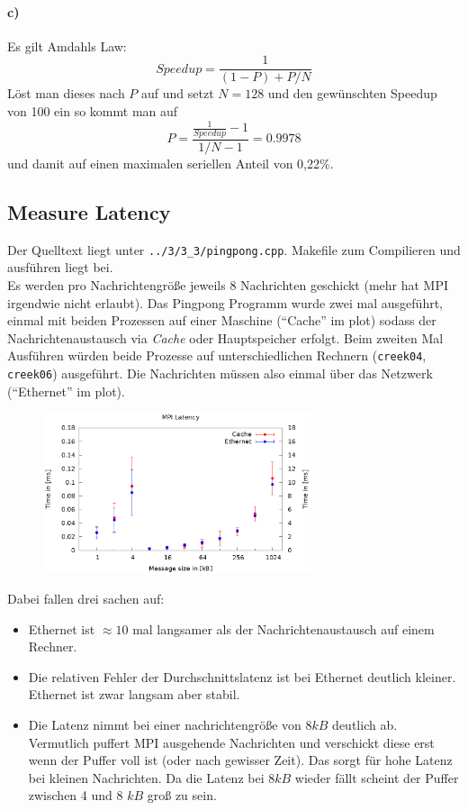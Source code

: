 \documentclass[a4paper,11pt]{scrartcl}
\begin{document}
\paragraph*{c)}
Es gilt Amdahls Law:
\[
Speedup=\frac{1}{(1-P)+P/N}
\] 
Löst man dieses nach $P$ auf und setzt $N=128$ und den gewünschten Speedup von 100 ein so kommt man auf
\[
P=\frac{\frac{1}{Speedup}-1}{1/N-1}=0.9978
\]
und damit auf einen maximalen seriellen Anteil von 0,22\%.
\subsection{Measure Latency}

Der Quelltext liegt unter \verb+../3/3_3/pingpong.cpp+. Makefile zum Compilieren und ausführen liegt bei. \\

Es werden pro Nachrichtengröße jeweils 8 Nachrichten geschickt (mehr hat MPI irgendwie nicht erlaubt). Das Pingpong Programm wurde zwei mal ausgeführt, einmal mit beiden Prozessen auf einer Maschine ("`Cache"' im plot) sodass der Nachrichtenaustausch via \emph{Cache} oder Hauptspeicher erfolgt. Beim zweiten Mal Ausführen würden beide Prozesse auf unterschiedlichen Rechnern (\verb+creek04+, \verb+creek06+) ausgeführt. Die Nachrichten müssen also einmal über das Netzwerk ("`Ethernet"' im plot).\\

\begin{figure}[!ht]
\centering
\includegraphics[width=0.7\textwidth,keepaspectratio]{3_3/data/plot.eps}
\end{figure}

Dabei fallen drei sachen auf: 

\begin{itemize}
    \item Ethernet ist $\approx 10$ mal langsamer als der Nachrichtenaustausch auf einem Rechner.
    \item Die relativen Fehler der Durchschnittslatenz ist bei Ethernet deutlich kleiner. Ethernet ist zwar langsam aber stabil.
    \item Die Latenz nimmt bei einer nachrichtengröße von $8kB$ deutlich ab. Vermutlich puffert MPI ausgehende Nachrichten und verschickt diese erst wenn der Puffer voll ist (oder nach gewisser Zeit). Das sorgt für hohe Latenz bei kleinen Nachrichten. Da die Latenz bei $8kB$ wieder fällt scheint der Puffer zwischen 4 und 8 $kB$ groß zu sein.
\end{itemize}
\end{document}
